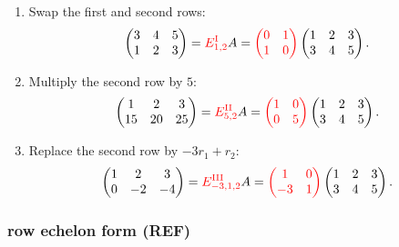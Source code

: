 \documentclass[12pt]{article}
\begin{document}
\begin{enumerate}
    \item[(I)] Swap the first and second rows:
    \[
    \begin{pmatrix}
    3&4&5\\
    1&2&3
    \end{pmatrix}
    =
    \textcolor{red}{E^{\mathrm{I}}_{1,2}}A
    =
    \textcolor{red}{\begin{pmatrix}
    0&1\\
    1&0
    \end{pmatrix}}
    \begin{pmatrix}
    1&2&3\\
    3&4&5
    \end{pmatrix}.
    \]

    \item[(II)] Multiply the second row by $5$:
    \[
    \begin{pmatrix}
    1&2&3\\
    15&20&25
    \end{pmatrix}
    =
    \textcolor{red}{E^{\mathrm{II}}_{5,2}}A
    =
    \textcolor{red}{\begin{pmatrix}
    1&0\\
    0&5
    \end{pmatrix}}
    \begin{pmatrix}
    1&2&3\\
    3&4&5
    \end{pmatrix}.
    \]

    \item[(III)] Replace the second row by $-3r_1+r_2$:
    \[
    \begin{pmatrix}
    1&2&3\\
    0&-2&-4
    \end{pmatrix}
    =
    \textcolor{red}{E^{\mathrm{III}}_{-3,1,2}}A
    =
    \textcolor{red}{\begin{pmatrix}
    1&0\\
    -3&1
    \end{pmatrix}}
    \begin{pmatrix}
    1&2&3\\
    3&4&5
    \end{pmatrix}.
    \]
\end{enumerate}

\subsubsection{row echelon form (REF)}
\end{document}
